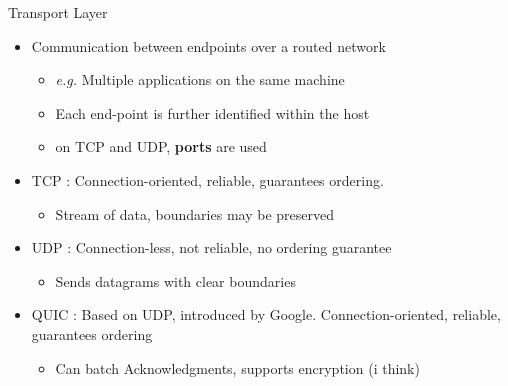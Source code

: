 \begin{frame}{Transport Layer}
	\begin{itemize}
		\item Communication between endpoints over a routed network
			\begin{itemize}
				\item \textit{e.g.} Multiple applications on the same machine
				\item Each end-point is further identified within the host 
				\item on TCP and UDP, \textbf{ports} are used
			\end{itemize}
		\item TCP : Connection-oriented, reliable, guarantees ordering.
			\begin{itemize}
				\item Stream of data, boundaries may be preserved
			\end{itemize}
		\item UDP : Connection-less, not reliable, no ordering guarantee
			\begin{itemize}
				\item Sends datagrams with clear boundaries
			\end{itemize}
		\item QUIC : Based on UDP, introduced by Google. Connection-oriented, reliable, guarantees ordering
			\begin{itemize}
				\item Can batch Acknowledgments, supports encryption (i think)
			\end{itemize}

	\end{itemize}
\end{frame}

